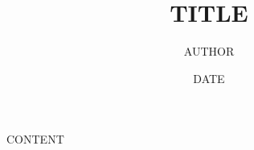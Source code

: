 \documentclass[11pt]{article}
\title{ TITLE}
\author{ AUTHOR }
\date{ DATE }
\begin{document}
\maketitle
\pagebreak

\tableofcontents
\pagebreak


CONTENT

\end{document}
